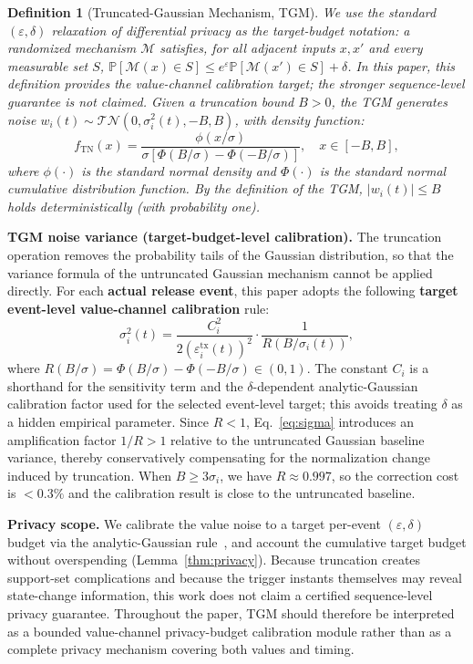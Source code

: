 \documentclass[10pt]{article}
\newtheorem{definition}{Definition}[section]
\begin{document}
\begin{definition}[Truncated-Gaussian Mechanism, TGM]
  We use the standard $(\varepsilon,\delta)$ relaxation of differential privacy as the target-budget notation: a randomized mechanism $\mathcal{M}$ satisfies, for all adjacent inputs $x,x'$ and every measurable set $S$, $\mathbb{P}[\mathcal{M}(x)\in S]\leq e^\varepsilon\mathbb{P}[\mathcal{M}(x')\in S]+\delta$. In this paper, this definition provides the value-channel calibration target; the stronger sequence-level guarantee is not claimed.
  Given a truncation bound $B>0$, the TGM generates noise $w_i(t)\sim\mathcal{TN}(0,\sigma_i^2(t),-B,B)$, with density function:
  \[
    f_{\mathrm{TN}}(x) = \frac{\phi(x/\sigma)}{\sigma[\Phi(B/\sigma)-\Phi(-B/\sigma)]},\quad x\in[-B,B],
  \]
  where $\phi(\cdot)$ is the standard normal density and $\Phi(\cdot)$ is the standard normal cumulative distribution function. By the definition of the TGM, $|w_i(t)|\leq B$ holds deterministically (with probability one).
\end{definition}

\textbf{TGM noise variance (target-budget-level calibration).} The truncation operation removes the probability tails of the Gaussian distribution, so that the variance formula of the untruncated Gaussian mechanism cannot be applied directly. For each \textbf{actual release event}, this paper adopts the following \textbf{target event-level value-channel calibration} rule:
\begin{equation}\label{eq:sigma}
  \sigma_i^2(t) = \frac{C_i^2}{2(\varepsilon_i^{\mathrm{tx}}(t))^2} \cdot \frac{1}{R(B/\sigma_i(t))},
\end{equation}
where $R(B/\sigma)=\Phi(B/\sigma)-\Phi(-B/\sigma)\in(0,1)$. The constant $C_i$ is a shorthand for the sensitivity term and the $\delta$-dependent analytic-Gaussian calibration factor used for the selected event-level target; this avoids treating $\delta$ as a hidden empirical parameter. Since $R<1$, Eq.~\eqref{eq:sigma} introduces an amplification factor $1/R>1$ relative to the untruncated Gaussian baseline variance, thereby conservatively compensating for the normalization change induced by truncation. When $B\geq3\sigma_i$, we have $R\approx0.997$, so the correction cost is $<0.3\%$ and the calibration result is close to the untruncated baseline.

\textbf{Privacy scope.} We calibrate the value noise to a target per-event $(\varepsilon,\delta)$ budget via the analytic-Gaussian rule~\cite{balle2018}, and account the cumulative target budget without overspending (Lemma~\ref{thm:privacy}). Because truncation creates support-set complications and because the trigger instants themselves may reveal state-change information, this work does not claim a certified sequence-level privacy guarantee. Throughout the paper, TGM should therefore be interpreted as a bounded value-channel privacy-budget calibration module rather than as a complete privacy mechanism covering both values and timing.
\end{document}
